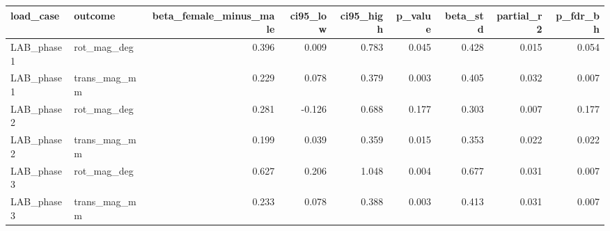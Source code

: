 \begin{tabular}{llrrrrrrr}
\toprule
load\_case & outcome & beta\_female\_minus\_male & ci95\_low & ci95\_high & p\_value & beta\_std & partial\_r2 & p\_fdr\_bh \\
\midrule
LAB\_phase1 & rot\_mag\_deg & 0.396 & 0.009 & 0.783 & 0.045 & 0.428 & 0.015 & 0.054 \\
LAB\_phase1 & trans\_mag\_mm & 0.229 & 0.078 & 0.379 & 0.003 & 0.405 & 0.032 & 0.007 \\
LAB\_phase2 & rot\_mag\_deg & 0.281 & -0.126 & 0.688 & 0.177 & 0.303 & 0.007 & 0.177 \\
LAB\_phase2 & trans\_mag\_mm & 0.199 & 0.039 & 0.359 & 0.015 & 0.353 & 0.022 & 0.022 \\
LAB\_phase3 & rot\_mag\_deg & 0.627 & 0.206 & 1.048 & 0.004 & 0.677 & 0.031 & 0.007 \\
LAB\_phase3 & trans\_mag\_mm & 0.233 & 0.078 & 0.388 & 0.003 & 0.413 & 0.031 & 0.007 \\
\bottomrule
\end{tabular}
